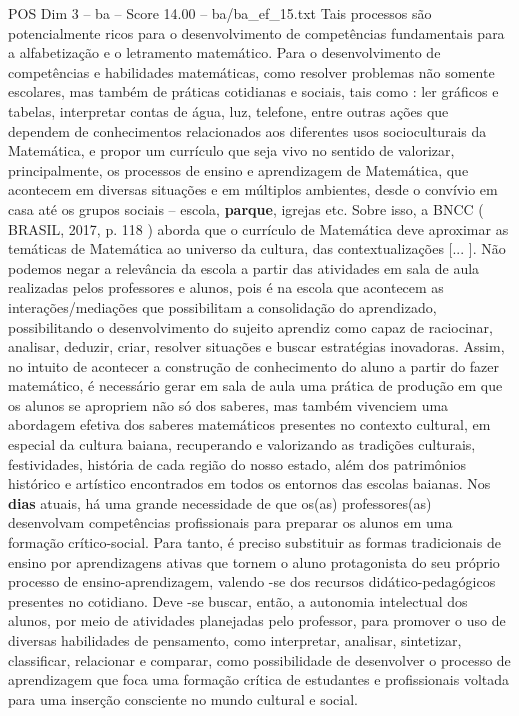 \begin{textsample}{POS Dim 3 – ba – Score 14.00 – ba/ba\_ef\_15.txt}
Tais processos são potencialmente ricos para o desenvolvimento de competências fundamentais para a alfabetização e o letramento matemático.
Para o desenvolvimento de competências e habilidades matemáticas, como resolver problemas não somente escolares, mas também de práticas cotidianas e sociais, tais como : ler gráficos e tabelas, interpretar contas de água, luz, telefone, entre outras ações que dependem de conhecimentos relacionados aos diferentes usos socioculturais da Matemática, e propor um currículo que seja vivo no sentido de valorizar, principalmente, os processos de ensino e aprendizagem de Matemática, que acontecem em diversas situações e em múltiplos ambientes, desde o convívio em casa até os grupos sociais – escola, \textbf{parque}, igrejas etc.
Sobre isso, a BNCC ( BRASIL, 2017, p. 118 ) aborda que o currículo de Matemática deve aproximar as temáticas de Matemática ao universo da cultura, das contextualizações [... ].
Não podemos negar a relevância da escola a partir das atividades em sala de aula realizadas pelos professores e alunos, pois é na escola que acontecem as interações/mediações que possibilitam a consolidação do aprendizado, possibilitando o desenvolvimento do sujeito aprendiz como capaz de raciocinar, analisar, deduzir, criar, resolver situações e buscar estratégias inovadoras.
Assim, no intuito de acontecer a construção de conhecimento do aluno a partir do fazer matemático, é necessário gerar em sala de aula uma prática de produção em que os alunos se apropriem não só dos saberes, mas também vivenciem uma abordagem efetiva dos saberes matemáticos presentes no contexto cultural, em especial da cultura baiana, recuperando e valorizando as tradições culturais, festividades, história de cada região do nosso estado, além dos patrimônios histórico e artístico encontrados em todos os entornos das escolas baianas.
Nos \textbf{dias} atuais, há uma grande necessidade de que os(as) professores(as) desenvolvam competências profissionais para preparar os alunos em uma formação crítico-social.
Para tanto, é preciso substituir as formas tradicionais de ensino por aprendizagens ativas que tornem o aluno protagonista do seu próprio processo de ensino-aprendizagem, valendo -se dos recursos didático-pedagógicos presentes no cotidiano.
Deve -se buscar, então, a autonomia intelectual dos alunos, por meio de atividades planejadas pelo professor, para promover o uso de diversas habilidades de pensamento, como interpretar, analisar, sintetizar, classificar, relacionar e comparar, como possibilidade de desenvolver o processo de aprendizagem que foca uma formação crítica de estudantes e profissionais voltada para uma inserção consciente no mundo cultural e social.

\end{textsample}
